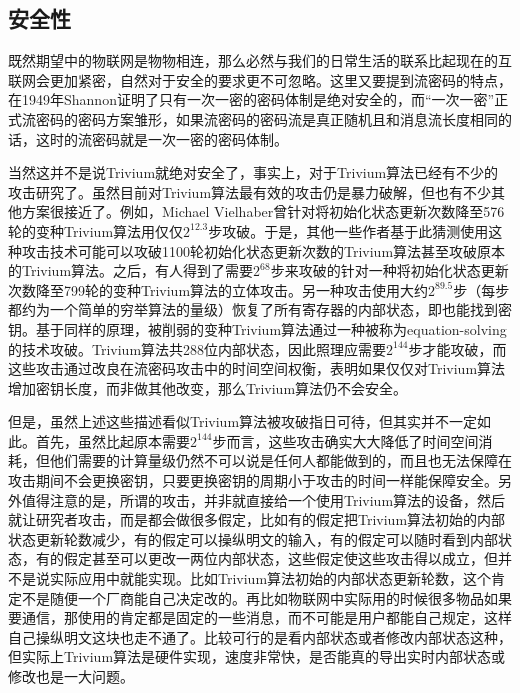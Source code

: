 \subsection{安全性}

既然期望中的物联网是物物相连，那么必然与我们的日常生活的联系比起现在的互联网会更加紧密，自然对于安全的要求更不可忽略。这里又要提到流密码的特点，在1949年Shannon证明了只有一次一密的密码体制是绝对安全的，而“一次一密”正式流密码的密码方案雏形，如果流密码的密码流是真正随机且和消息流长度相同的话，这时的流密码就是一次一密的密码体制。

当然这并不是说Trivium就绝对安全了，事实上，对于Trivium算法已经有不少的攻击研究了。虽然目前对Trivium算法最有效的攻击仍是暴力破解，但也有不少其他方案很接近了。例如，Michael Vielhaber曾针对将初始化状态更新次数降至576轮的变种Trivium算法用仅仅$2^{12.3}$步攻破\parencite{cryptoeprint:2007:413}。于是，其他一些作者基于此猜测使用这种攻击技术可能可以攻破1100轮初始化状态更新次数的Trivium算法甚至攻破原本的Trivium算法\parencite{cryptoeprint:2008:385}。之后，有人得到了需要$2^{68}$步来攻破的针对一种将初始化状态更新次数降至799轮的变种Trivium算法的立体攻击\parencite{cryptoeprint:2015:312}。另一种攻击使用大约$2^{89.5}$步（每步都约为一个简单的穷举算法的量级）恢复了所有寄存器的内部状态，即也能找到密钥\parencite{cryptoeprint:2007:021}。基于同样的原理，被削弱的变种Trivium算法通过一种被称为equation-solving的技术攻破\parencite{raddum2006cryptanalytic}。Trivium算法共288位内部状态，因此照理应需要$2^{144}$步才能攻破，而这些攻击通过改良在流密码攻击中的时间空间权衡，表明如果仅仅对Trivium算法增加密钥长度，而非做其他改变，那么Trivium算法仍不会安全。

但是，虽然上述这些描述看似Trivium算法被攻破指日可待，但其实并不一定如此。首先，虽然比起原本需要$2^{144}$步而言，这些攻击确实大大降低了时间空间消耗，但他们需要的计算量级仍然不可以说是任何人都能做到的，而且也无法保障在攻击期间不会更换密钥，只要更换密钥的周期小于攻击的时间一样能保障安全。另外值得注意的是，所谓的攻击，并非就直接给一个使用Trivium算法的设备，然后就让研究者攻击，而是都会做很多假定，比如有的假定把Trivium算法初始的内部状态更新轮数减少，有的假定可以操纵明文的输入，有的假定可以随时看到内部状态，有的假定甚至可以更改一两位内部状态，这些假定使这些攻击得以成立，但并不是说实际应用中就能实现。比如Trivium算法初始的内部状态更新轮数，这个肯定不是随便一个厂商能自己决定改的。再比如物联网中实际用的时候很多物品如果要通信，那使用的肯定都是固定的一些消息，而不可能是用户都能自己规定，这样自己操纵明文这块也走不通了。比较可行的是看内部状态或者修改内部状态这种，但实际上Trivium算法是硬件实现，速度非常快，是否能真的导出实时内部状态或修改也是一大问题。

